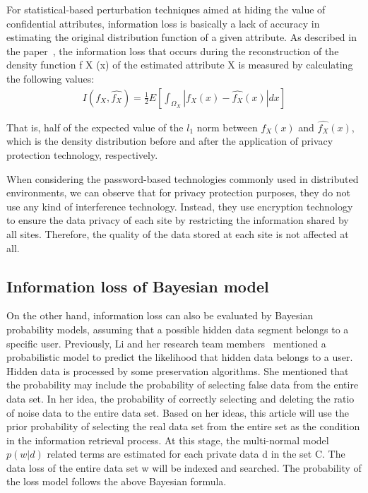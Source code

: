 \documentclass[journal,transmag]{IEEEtran}
\begin{document}
For statistical-based perturbation techniques aimed at hiding the value of confidential attributes, information loss is basically a lack of accuracy in estimating the original distribution function of a given attribute. As described in the paper~\cite{sweeney2002achieving}, the information loss that occurs during the reconstruction of the density function f X (x) of the estimated attribute X is measured by calculating the following values:
\begin{eqnarray}\label{IFLLformula}
I(f_X,\widehat{f_X})=\frac{1}{2} E[\int_{\Omega_X} |f_X(x)  - \widehat{f_X}(x) | dx ]
\end{eqnarray}

That is, half of the expected value of the $ l_1 $ norm between $ f_X (x) $ and $\widehat{f_X}(x)$, which is the density distribution before and after the application of privacy protection technology, respectively.

When considering the password-based technologies commonly used in distributed environments, we can observe that for privacy protection purposes, they do not use any kind of interference technology. Instead, they use encryption technology to ensure the data privacy of each site by restricting the information shared by all sites. Therefore, the quality of the data stored at each site is not affected at all.


\subsection{Information loss of Bayesian model}
On the other hand, information loss can also be evaluated by Bayesian probability models, assuming that a possible hidden data segment belongs to a specific user. Previously, Li and her research team members~\cite{xuinformation2014} mentioned a probabilistic model to predict the likelihood that hidden data belongs to a user. Hidden data is processed by some preservation algorithms. She mentioned that the probability may include the probability of selecting false data from the entire data set. In her idea, the probability of correctly selecting and deleting the ratio of noise data to the entire data set. Based on her ideas, this article will use the prior probability of selecting the real data set from the entire set as the condition in the information retrieval process. At this stage, the multi-normal model $p(w|d)$ related terms are estimated for each private data d in the set C. The data loss of the entire data set w will be indexed and searched. The probability of the loss model follows the above Bayesian formula.
\end{document}
